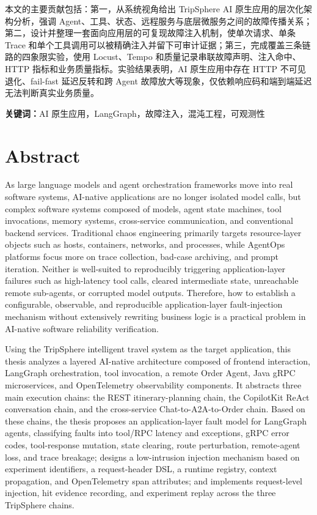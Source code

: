 本文的主要贡献包括：第一，从系统视角给出 TripSphere AI 原生应用的层次化架构分析，强调 Agent、工具、状态、远程服务与底层微服务之间的故障传播关系；第二，设计并整理一套面向应用层的可复现故障注入机制，使单次请求、单条 Trace 和单个工具调用可以被精确注入并留下可审计证据；第三，完成覆盖三条链路的四象限实验，使用 Locust、Tempo 和质量记录串联故障声明、注入命中、HTTP 指标和业务质量指标。实验结果表明，AI 原生应用中存在 HTTP 不可见退化、fail-fast 延迟反转和跨 Agent 故障放大等现象，仅依赖响应码和端到端延迟无法判断真实业务质量。

\noindent\textbf{关键词：}AI 原生应用，LangGraph，故障注入，混沌工程，可观测性

\chapter*{Abstract}

As large language models and agent orchestration frameworks move into real software systems, AI-native applications are no longer isolated model calls, but complex software systems composed of models, agent state machines, tool invocations, memory systems, cross-service communication, and conventional backend services. Traditional chaos engineering primarily targets resource-layer objects such as hosts, containers, networks, and processes, while AgentOps platforms focus more on trace collection, bad-case archiving, and prompt iteration. Neither is well-suited to reproducibly triggering application-layer failures such as high-latency tool calls, cleared intermediate state, unreachable remote sub-agents, or corrupted model outputs. Therefore, how to establish a configurable, observable, and reproducible application-layer fault-injection mechanism without extensively rewriting business logic is a practical problem in AI-native software reliability verification.

Using the TripSphere intelligent travel system as the target application, this thesis analyzes a layered AI-native architecture composed of frontend interaction, LangGraph orchestration, tool invocation, a remote Order Agent, Java gRPC microservices, and OpenTelemetry observability components. It abstracts three main execution chains: the REST itinerary-planning chain, the CopilotKit ReAct conversation chain, and the cross-service Chat-to-A2A-to-Order chain. Based on these chains, the thesis proposes an application-layer fault model for LangGraph agents, classifying faults into tool/RPC latency and exceptions, gRPC error codes, tool-response mutation, state clearing, route perturbation, remote-agent loss, and trace breakage; designs a low-intrusion injection mechanism based on experiment identifiers, a request-header DSL, a runtime registry, context propagation, and OpenTelemetry span attributes; and implements request-level injection, hit evidence recording, and experiment replay across the three TripSphere chains.

